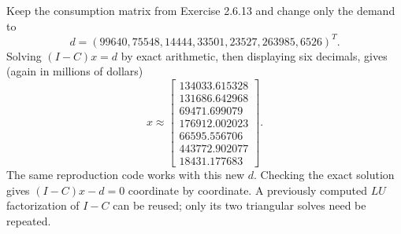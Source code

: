 Keep the consumption matrix from Exercise 2.6.13 and change only
the demand to
\[d=(99640,75548,14444,33501,23527,263985,6526)^T.\]
Solving $(I-C)x=d$ by exact arithmetic, then displaying six decimals,
gives (again in millions of dollars)
\[x\approx\begin{bmatrix}134033.615328\\131686.642968\\69471.699079\\
176912.002023\\66595.556706\\443772.902077\\18431.177683\end{bmatrix}.\]
The same reproduction code works with this new $d$.
Checking the exact solution gives $(I-C)x-d=0$ coordinate by coordinate.
A previously computed $LU$ factorization of $I-C$ can be reused;
only its two triangular solves need be repeated.

